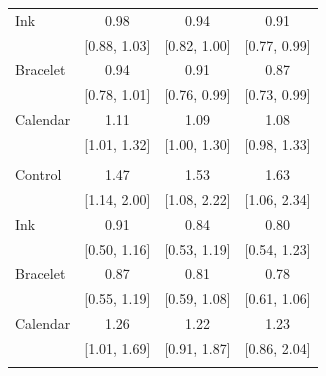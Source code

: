 \begin{tabular}{lccc}
Ink & 0.98 & 0.94 & 0.91 \\
 & [0.88, 1.03] & [0.82, 1.00] & [0.77, 0.99] \\
Bracelet & 0.94 & 0.91 & 0.87 \\
 & [0.78, 1.01] & [0.76, 0.99] & [0.73, 0.99] \\
Calendar & 1.11 & 1.09 & 1.08 \\
 & [1.01, 1.32] & [1.00, 1.30] & [0.98, 1.33] \\
\addlinespace
\multicolumn{4}{l}{\textit{Exponential cluster weights}} \\
Control & 1.47 & 1.53 & 1.63 \\
 & [1.14, 2.00] & [1.08, 2.22] & [1.06, 2.34] \\
Ink & 0.91 & 0.84 & 0.80 \\
 & [0.50, 1.16] & [0.53, 1.19] & [0.54, 1.23] \\
Bracelet & 0.87 & 0.81 & 0.78 \\
 & [0.55, 1.19] & [0.59, 1.08] & [0.61, 1.06] \\
Calendar & 1.26 & 1.22 & 1.23 \\
 & [1.01, 1.69] & [0.91, 1.87] & [0.86, 2.04] \\
\addlinespace
\bottomrule
\end{tabular}
